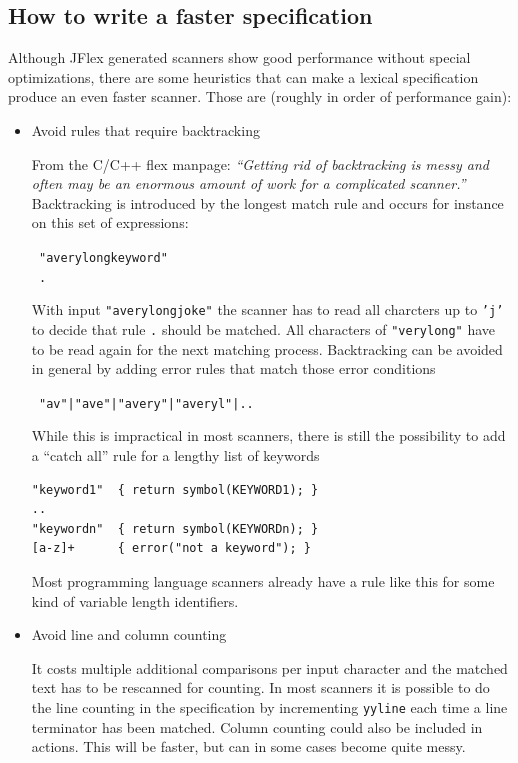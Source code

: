 \documentclass[11pt]{scrartcl}
\newcommand{\trit}{\em}
\begin{document}
\subsection{How to write a faster specification\label{PerformanceTips}}
Although JFlex generated scanners show good performance without
special optimizations, there are some heuristics that can make a
lexical specification produce an even faster scanner. Those are
(roughly in order of performance gain):
 
\begin{itemize}
\item
Avoid rules that require backtracking

From the C/C++ flex \cite{flex} manpage: {\trit ``Getting rid
of backtracking is messy and often may be an enormous amount of work for
a complicated scanner.''} Backtracking is introduced by the longest match
rule and occurs for instance on this set of expressions:
 
\texttt{  "averylongkeyword"}\\
\texttt{  .}
 
With input \texttt{"averylongjoke"} the scanner has to read all charcters
up to \texttt{'j' }to decide that rule \texttt{.} should be matched. All
characters of \texttt{"verylong"} have to be read again for the next
matching process. Backtracking can be avoided in general by adding
error rules that match those error conditions 

\verb+ "av"|"ave"|"avery"|"averyl"|..+

While this is impractical in most scanners, there is still the
possibility to add a ``catch all'' rule for a lengthy list of keywords
\begin{verbatim}
"keyword1"  { return symbol(KEYWORD1); } 
.. 
"keywordn"  { return symbol(KEYWORDn); }
[a-z]+      { error("not a keyword"); }
\end{verbatim}
Most programming language scanners already have a rule like this for
some kind of variable length identifiers.

\item
  Avoid line and column counting
  
  It costs multiple additional comparisons per input character and the
  matched text has to be rescanned for counting. In most scanners it
  is possible to do the line counting in the specification by
  incrementing \texttt{yyline} each time a line terminator has been
  matched.  Column counting could also be included in actions. This
  will be faster, but can in some cases become quite messy.
 

\end{itemize}
\end{document}
